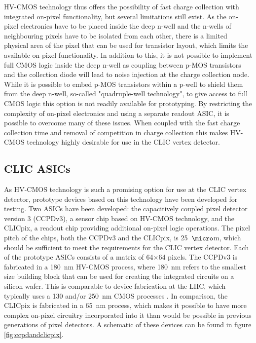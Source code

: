 HV-CMOS technology thus offers the possibility of fast charge collection with integrated on-pixel functionality, but several limitations still exist.  As the on-pixel electronics have to be placed inside the deep n-well and the n-wells of neighbouring pixels have to be isolated from each other, there is a limited physical area of the pixel that can be used for transistor layout, which limits the available on-pixel functionality.  In addition to this, it is not possible to implement full CMOS logic inside the deep n-well as coupling between p-MOS transistors and the collection diode will lead to noise injection at the charge collection node.  While it is possible to embed p-MOS transistors within a p-well to shield them from the deep n-well, so-called "quadruple-well technology", to give access to full CMOS logic this option is not readily available for prototyping.  By restricting the complexity of on-pixel electronics and using a separate readout ASIC, it is possible to overcome many of these issues.  When coupled with the fast charge collection time and removal of competition in charge collection this makes HV-CMOS technology highly desirable for use in the CLIC vertex detector.


\subsection{CLIC ASICs}
As HV-CMOS technology is such a promising option for use at the CLIC vertex detector, prototype devices based on this technology have been developed for testing.  Two ASICs have been developed: the capacitively coupled pixel detector version 3 (CCPDv3), a sensor chip based on HV-CMOS technology, and the CLICpix, a readout chip providing additional on-pixel logic operations.  The pixel pitch of the chips, both the CCPDv3 and the CLICpix, is 25~${\micro}$m, which should be sufficient to meet the requirements for the CLIC vertex detector.  Each of the prototype ASICs consists of a matrix of 64$\times$64 pixels.  The CCPDv3 is fabricated in a 180~nm HV-CMOS process, where 180~nm refers to the smallest size building block that can be used for creating the integrated circuits on a silicon wafer.  This is comparable to device fabrication at the LHC, which typically uses a 130 and/or 250~nm CMOS processes \cite{Aaij:2244311, Dominguez:1481838}.  In comparison, the CLICpix is fabricated in a 65~nm process, which makes it possible to have more complex on-pixel circuitry incorporated into it than would be possible in previous generations of pixel detectors.  A schematic of these devices can be found in figure \ref{fig:ccpdandclicpix}.  


